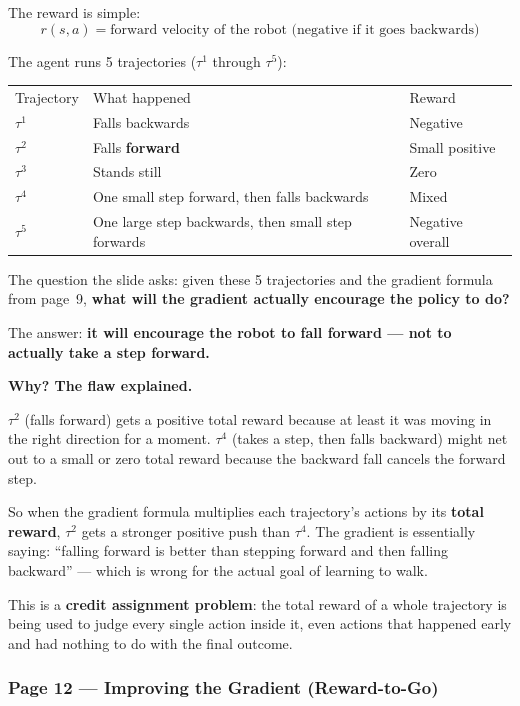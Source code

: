 The reward is simple:
\[
  r(s,a) = \text{forward velocity of the robot (negative if it goes backwards)}
\]

The agent runs 5 trajectories ($\tau^1$ through $\tau^5$):

\begin{tabular}{lll}
  Trajectory & What happened & Reward \\[4pt]
  $\tau^1$ & Falls backwards & Negative \\
  $\tau^2$ & Falls \textbf{forward} & Small positive \\
  $\tau^3$ & Stands still & Zero \\
  $\tau^4$ & One small step forward, then falls backwards & Mixed \\
  $\tau^5$ & One large step backwards, then small step forwards & Negative overall \\
\end{tabular}

\medskip
The question the slide asks: given these 5 trajectories and the gradient formula from page~9,
\textbf{what will the gradient actually encourage the policy to do?}

The answer: \textbf{it will encourage the robot to fall forward --- not to actually take a
step forward.}

\medskip
\textbf{Why? The flaw explained.}

$\tau^2$ (falls forward) gets a positive total reward because at least it was moving in the
right direction for a moment. $\tau^4$ (takes a step, then falls backward) might net out to a
small or zero total reward because the backward fall cancels the forward step.

So when the gradient formula multiplies each trajectory's actions by its \textbf{total reward},
$\tau^2$ gets a stronger positive push than $\tau^4$. The gradient is essentially saying:
``falling forward is better than stepping forward and then falling backward'' --- which is
wrong for the actual goal of learning to walk.

This is a \textbf{credit assignment problem}: the total reward of a whole trajectory is being
used to judge every single action inside it, even actions that happened early and had nothing
to do with the final outcome.

\subsubsection*{Page 12 --- Improving the Gradient (Reward-to-Go)}


